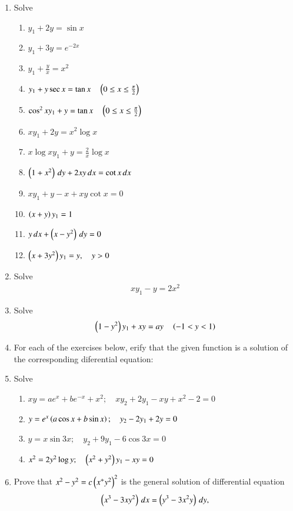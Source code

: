 \begin{enumerate}[label=\arabic*.,ref=\thesubsection.\theenumi]
\begin{enumerate}[label = (\roman*)]
\end{enumerate}
%
\item Solve
%
\begin{enumerate}[label = (\roman*)]
\item  $y_1 + 2y = \sin x$
\item  $y_1 + 3y = e^{-2x}$
\item  $y_1 + \frac{y}{x} = x^2$
\item  $y_1 + y\sec x  = \tan x \quad \left(0 \le x \le \frac{\pi}{2}\right)$
\item  $\cos^2 x y_1 + y  = \tan x \quad \left(0 \le x \le \frac{\pi}{2}\right)$
\item  $xy_1 + 2y = x^2\log x$
\item  $x\log xy_1 + y = \frac{2}{x}\log x$
\item  $\left(1+x^2\right)\, dy + 2xy \, dx = \cot x \, dx$
\item  $x y_1 + y-x + xy \cot x = 0$
\item  $\left(x+y\right) y_1 = 1$
\item  $y\, dx + \left(x-y^2\right)\, dy = 0$
\item  $\left(x+3y^2\right) y_1 = y, \quad y > 0$
\end{enumerate}
%
\item Solve 
%
\begin{align}
xy_1 -y = 2x^2
\end{align}
%
\item Solve 
%
\begin{align}
\left(1-y^2\right)y_1 +xy = ay \quad \left(-1 < y < 1\right)
\end{align}
%
\item For each of the exercises below, erify that the given function is a solution of the corresponding diferential equation:
%
\item Solve
%
\begin{enumerate}[label = (\roman*)]
\item  $xy = ae^x+be^{-x} + x^2; \quad xy_2+2y_1-xy+x^2-2 = 0$
\item  $y = e^x\left(a\cos x +b\sin x\right); \quad y_2-2y_1+2y = 0$
\item  $y = x\sin 3x ; \quad y_2+9y_1-6\cos 3x = 0$
\item  $x^2 = 2y^2 \log y; \quad \left(x^2+y^2\right)y_1-xy = 0$
\end{enumerate}
%
\item Prove that $x^2-y^2 = c\left(x^+y^2\right)^2$ is the general solution of differential equation 
%
\begin{align}
\brak{x^3-3xy^2}\, dx = \brak{y^3-3x^2y}\, dy,

\end{align}
\end{enumerate}

